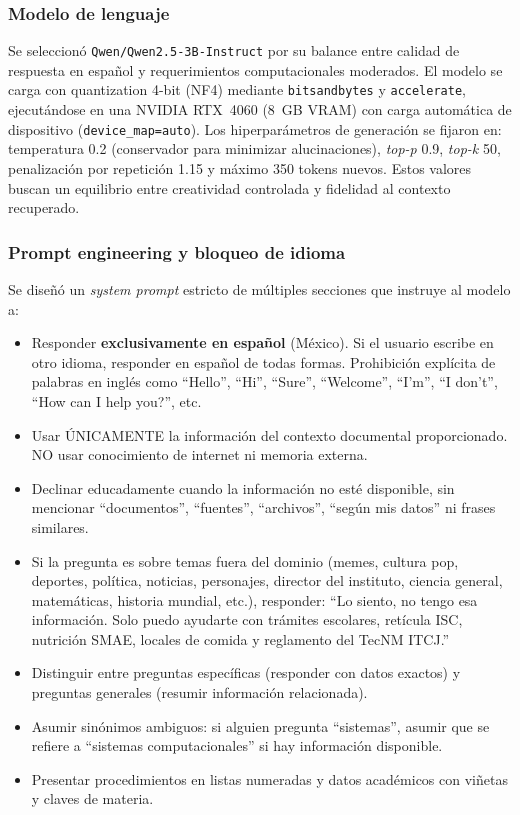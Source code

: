\subsubsection{Modelo de lenguaje}

Se seleccionó \texttt{Qwen/Qwen2.5-3B-Instruct} por su balance entre calidad de respuesta en español y requerimientos computacionales moderados. El modelo se carga con quantization 4-bit (NF4) mediante \texttt{bitsandbytes} y \texttt{accelerate}, ejecutándose en una NVIDIA RTX~4060 (8~GB VRAM) con carga automática de dispositivo (\texttt{device\_map=auto}). Los hiperparámetros de generación se fijaron en: temperatura 0.2 (conservador para minimizar alucinaciones), \textit{top-p} 0.9, \textit{top-k} 50, penalización por repetición 1.15 y máximo 350 tokens nuevos. Estos valores buscan un equilibrio entre creatividad controlada y fidelidad al contexto recuperado.

\subsubsection{Prompt engineering y bloqueo de idioma}

Se diseñó un \textit{system prompt} estricto de múltiples secciones que instruye al modelo a:
\begin{itemize}
    \item Responder \textbf{exclusivamente en español} (México). Si el usuario escribe en otro idioma, responder en español de todas formas. Prohibición explícita de palabras en inglés como ``Hello'', ``Hi'', ``Sure'', ``Welcome'', ``I'm'', ``I don't'', ``How can I help you?'', etc.
    \item Usar ÚNICAMENTE la información del contexto documental proporcionado. NO usar conocimiento de internet ni memoria externa.
    \item Declinar educadamente cuando la información no esté disponible, sin mencionar ``documentos'', ``fuentes'', ``archivos'', ``según mis datos'' ni frases similares.
    \item Si la pregunta es sobre temas fuera del dominio (memes, cultura pop, deportes, política, noticias, personajes, director del instituto, ciencia general, matemáticas, historia mundial, etc.), responder: ``Lo siento, no tengo esa información. Solo puedo ayudarte con trámites escolares, retícula ISC, nutrición SMAE, locales de comida y reglamento del TecNM ITCJ.''
    \item Distinguir entre preguntas específicas (responder con datos exactos) y preguntas generales (resumir información relacionada).
    \item Asumir sinónimos ambiguos: si alguien pregunta ``sistemas'', asumir que se refiere a ``sistemas computacionales'' si hay información disponible.
    \item Presentar procedimientos en listas numeradas y datos académicos con viñetas y claves de materia.
\end{itemize}

